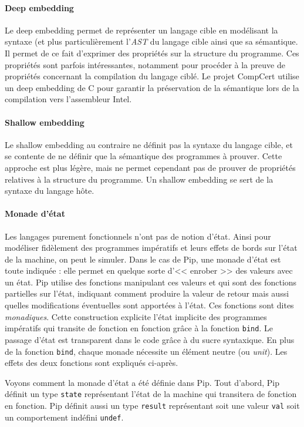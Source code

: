 				\paragraph{Deep embedding} Le deep embedding permet de représenter un langage cible en modélisant la syntaxe (et plus particulièrement l'\emph{AST} du langage cible ainsi que sa sémantique. Il permet de ce fait d'exprimer des propriétés sur la structure du programme. Ces propriétés sont parfois intéressantes, notamment pour procéder à la preuve de propriétés concernant la compilation du langage ciblé. Le projet CompCert utilise un deep embedding de C pour garantir la préservation de la sémantique lors de la compilation vers l'assembleur Intel.
				\paragraph{Shallow embedding} Le shallow embedding au contraire ne définit pas la syntaxe du langage cible, et se contente de ne définir que la sémantique des programmes à prouver. Cette approche est plus légère, mais ne permet cependant pas de prouver de propriétés relatives à la structure du programme. Un shallow embedding se sert de la syntaxe du langage hôte.

				\label{monad}
				\paragraph{Monade d'état} Les langages purement fonctionnels n'ont pas de notion d'état. Ainsi pour modéliser fidèlement des programmes impératifs et leurs effets de bords sur l'état de la machine, on peut le simuler. Dans le cas de Pip, une monade d'état est toute indiquée : elle permet en quelque sorte d'<< enrober >> des valeurs avec un état. Pip utilise des fonctions manipulant ces valeurs et qui sont des fonctions partielles sur l'état, indiquant comment produire la valeur de retour mais aussi quelles modifications éventuelles sont apportées à l'état. Ces fonctions sont dites \emph{monadiques}. Cette construction explicite l'état implicite des programmes impératifs qui transite de fonction en fonction grâce à la fonction \texttt{bind}. Le passage d'état est transparent dans le code grâce à du sucre syntaxique. En plus de la fonction \texttt{bind}, chaque monade nécessite un élément neutre (ou \emph{unit}). Les effets des deux fonctions sont expliqués ci-après.

				Voyons comment la monade d'état a été définie dans Pip. Tout d'abord, Pip définit un type \texttt{state} représentant l'état de la machine qui transitera de fonction en fonction. Pip définit aussi un type \texttt{result} représentant soit une valeur \texttt{val} soit un comportement indéfini \texttt{undef}.

